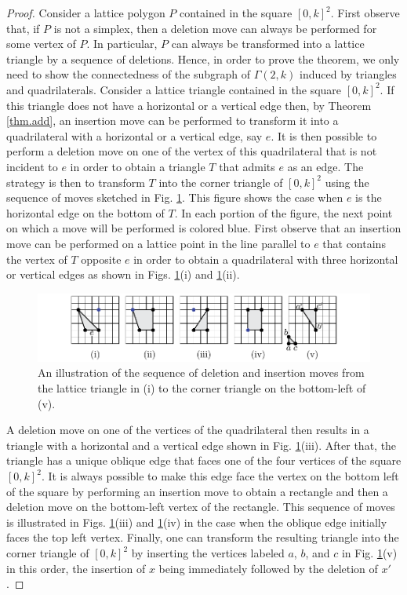 \begin{proof}
Consider a lattice polygon $P$ contained in the square $[0,k]^2$. First observe that, if $P$ is not a simplex, then a deletion move can always be performed for some vertex of $P$. In particular, $P$ can always be transformed into a lattice triangle by a sequence of deletions. Hence, in order to prove the theorem, we only need to show the connectedness of the subgraph of $\Gamma(2,k)$ induced by triangles and quadrilaterals. Consider a lattice triangle contained in the square $[0,k]^2$. If this triangle does not have a horizontal or a vertical edge then, by Theorem \ref{thm.add}, an insertion move can be performed to transform it into a quadrilateral with a horizontal or a vertical edge, say $e$. It is then possible to perform a deletion move on one of the vertex of  this quadrilateral that is not incident to $e$ in order to obtain a triangle $T$ that admits $e$ as an edge. The strategy is then to transform $T$ into the corner triangle of $[0,k]^2$ using the sequence of moves sketched in Fig. \ref{fig:connect}. This figure shows the case when $e$ is the horizontal edge on the bottom of $T$. In each portion of the figure, the next point on which a move will be performed is colored blue. First observe that an insertion move can be performed on a lattice point in the line parallel to $e$ that contains the vertex of $T$ opposite $e$ in order to obtain a quadrilateral with three horizontal or vertical edges as shown in Figs. \ref{fig:connect}(i) and \ref{fig:connect}(ii).
\begin{figure}[b]
\begin{center}
\includegraphics[width=\textwidth]{../assets/connect}
\caption{An illustration of the sequence of deletion and insertion moves from the lattice triangle in (i) to the corner triangle on the bottom-left of (v).}
\label{fig:connect}
\end{center}
\end{figure}
A deletion move on one of the vertices of the quadrilateral then results in a triangle with a horizontal and a vertical edge shown in Fig. \ref{fig:connect}(iii). After that, the triangle has a unique oblique edge that faces one of the four vertices of the square $[0,k]^2$. It is always possible to make this edge face the vertex on the bottom left of the square by performing an insertion move to obtain a rectangle and then a deletion move on the bottom-left vertex of the rectangle. This sequence of moves is illustrated in Figs. \ref{fig:connect}(iii) and \ref{fig:connect}(iv) in the case when the oblique edge initially faces the top left vertex. Finally, one can transform the resulting triangle into the corner triangle of $[0,k]^2$ by inserting the vertices labeled $a$, $b$, and $c$ in Fig. \ref{fig:connect}(v) in this order, the insertion of $x$ being immediately followed by the deletion of $x'$.
\end{proof}

